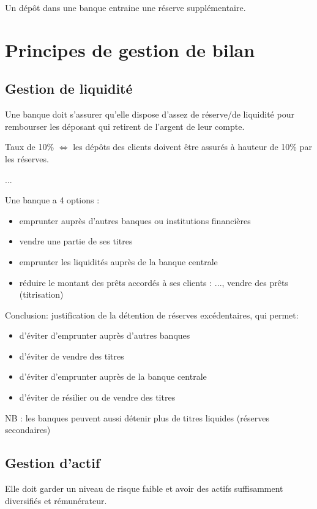 	Un dépôt dans une banque entraine une réserve supplémentaire.
	
	\section{Principes de gestion de bilan}
	
	\subsection{Gestion de liquidité}
	
	Une banque doit s'assurer qu'elle dispose d'assez de réserve/de liquidité pour rembourser les déposant qui retirent de l'argent de leur compte.
	
	Taux de 10\% $\Leftrightarrow$ les dépôts des clients doivent être assurés à hauteur de 10\% par les réserves.
	
	...
	
	Une banque a 4 options :
	
	\begin{itemize}
		\item emprunter auprès d'autres banques ou institutions financières
		\item vendre une partie de ses titres
		\item emprunter les liquidités auprès de la banque centrale
		\item réduire le montant des prêts accordés à ses clients : ..., vendre des prêts (titrisation)
	\end{itemize}
	
	Conclusion: justification de la détention de 
réserves excédentaires, qui permet: 
	\begin{itemize}
		\item d'éviter d'emprunter auprès d'autres banques 
		\item d'éviter de vendre des titres 
		\item d'éviter d'emprunter auprès de la banque centrale 
		\item d'éviter de résilier ou de vendre des titres 
	\end{itemize}
	
	NB : les banques peuvent aussi détenir plus de titres liquides (réserves secondaires) 
	
	\subsection{Gestion d'actif}
	
	Elle doit garder un niveau de risque faible et avoir des actifs suffisamment diversifiés et rémunérateur.
	
